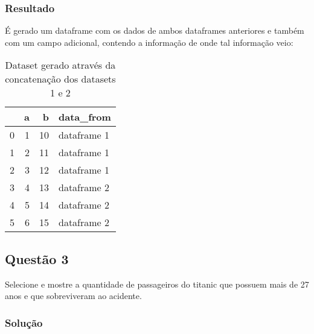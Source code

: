 \documentclass{assignment}
\begin{document}
\subsubsection*{Resultado}
É gerado um dataframe com os dados de ambos dataframes anteriores e também com um campo adicional, contendo a informação de onde tal informação veio:
\begin{table}[H]
    \centering
    \caption{Dataset gerado através da concatenação dos datasets 1 e 2}
    \begin{tabular}{lrrl}
        \toprule
        {} &  a &   b &    data\_from \\
        \midrule
        0 &  1 &  10 &  dataframe 1 \\
        1 &  2 &  11 &  dataframe 1 \\
        2 &  3 &  12 &  dataframe 1 \\
        3 &  4 &  13 &  dataframe 2 \\
        4 &  5 &  14 &  dataframe 2 \\
        5 &  6 &  15 &  dataframe 2 \\
        \bottomrule
    \end{tabular}
\end{table}

\subsection*{Questão 3}
Selecione e mostre a quantidade de passageiros do titanic que possuem mais de 27 anos e que
sobreviveram ao acidente.
\subsubsection*{Solução}

\end{document}

